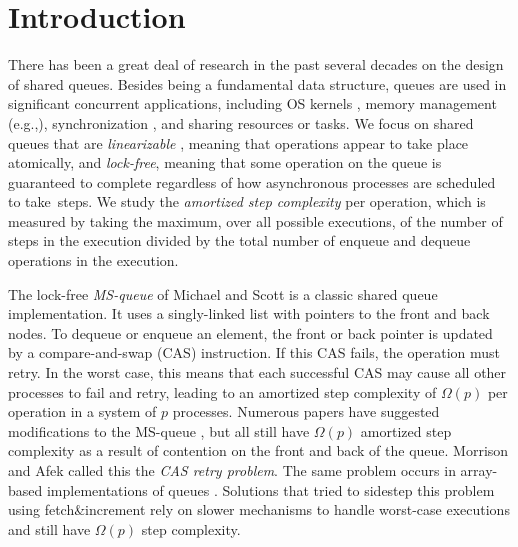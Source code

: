 
\section{Introduction}

There has been a great deal of research in the past several decades on the design of shared queues.
Besides being a fundamental data structure, queues are used in
significant concurrent applications, including OS kernels \cite{MP91}, memory management (e.g.,\cite{BBFRSW21}),
synchronization \cite{KAE23}, 
 and sharing resources or tasks.
We focus on shared queues that are \emph{linearizable} \cite{HW90}, meaning that operations
appear to take place atomically, and \emph{lock-free}, meaning that some operation on the queue
is guaranteed to complete regardless of how asynchronous processes are scheduled to take~steps.
We study the \emph{amortized step complexity} per operation, which is measured by taking the maximum, over all possible
executions, of the number of steps in the execution divided by the total number of enqueue and dequeue operations in the execution.

The lock-free \emph{MS-queue} of Michael and Scott \cite{MS98} is a classic shared queue implementation.
It uses a singly-linked list with pointers to the front and back nodes.
To dequeue or enqueue an element, the front or back pointer is updated by a 
compare-and-swap (CAS) instruction.
If this CAS fails, the operation must retry.
In the worst case, this means that each successful CAS may cause all other processes to
fail and retry, leading to an amortized step complexity of $\Omega(p)$ per operation in a system of $p$ processes.
Numerous papers have suggested modifications to the MS-queue \cite{DBLP:conf/opodis/HoffmanSS07,DBLP:conf/podc/KoganH14,DBLP:conf/ppopp/KoganP11,DBLP:journals/dc/Ladan-MozesS08,MKLLP22,DBLP:conf/spaa/MoirNSS05,RC17}, but 
all still have $\Omega(p)$ amortized step complexity as a result of
contention on the front and back of the queue.
Morrison and Afek \cite{DBLP:conf/ppopp/MorrisonA13} called this the \emph{CAS retry problem}.
The same problem occurs in array-based implementations of queues \cite{DBLP:conf/iceccs/ColvinG05,DBLP:conf/opodis/GidenstamST10,DBLP:conf/icdcn/Shafiei09,DBLP:conf/spaa/TsigasZ01}.
Solutions that tried to sidestep this problem using fetch\&increment \cite{DBLP:conf/ppopp/MorrisonA13,Nik19,10.1145/3490148.3538572,DBLP:conf/ppopp/YangM16}
rely on slower mechanisms to handle worst-case executions and still have $\Omega(p)$ step complexity.

